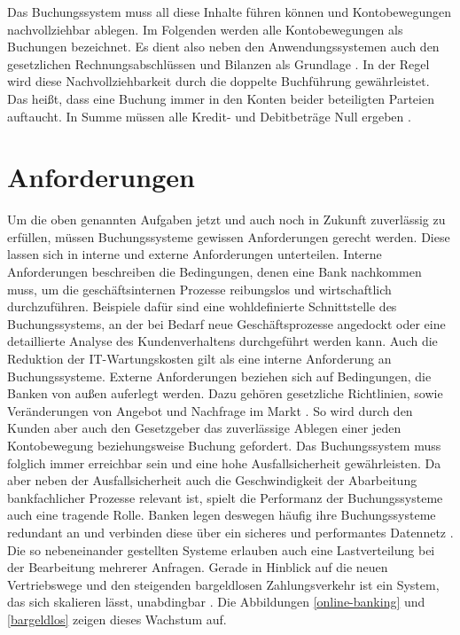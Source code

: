 \documentclass[12pt,oneside,a4paper,parskip]{scrbook}
\begin{document}
Das Buchungssystem muss all diese Inhalte führen können und Kontobewegungen nachvollziehbar ablegen. Im Folgenden werden alle Kontobewegungen als Buchungen bezeichnet. Es dient also neben den Anwendungssystemen auch den gesetzlichen Rechnungsabschlüssen und Bilanzen als Grundlage \cite{bankEnzy}\cite{MarkstudieKernbankensysteme}. In der Regel wird diese Nachvollziehbarkeit durch die doppelte Buchführung gewährleistet. Das heißt, dass eine Buchung immer in den Konten beider beteiligten Parteien auftaucht. In Summe müssen alle Kredit- und Debitbeträge Null ergeben \cite{accounting}.

\section{Anforderungen}
Um die oben genannten Aufgaben jetzt und auch noch in Zukunft zuverlässig zu erfüllen, müssen Buchungssysteme gewissen Anforderungen gerecht werden. Diese lassen sich in interne und externe Anforderungen unterteilen. Interne Anforderungen beschreiben die Bedingungen, denen eine Bank nachkommen muss, um die geschäftsinternen Prozesse reibungslos und wirtschaftlich durchzuführen. Beispiele dafür sind eine wohldefinierte Schnittstelle des Buchungssystems, an der bei Bedarf neue Geschäftsprozesse angedockt oder eine detaillierte Analyse des Kundenverhaltens durchgeführt werden kann. Auch die Reduktion der IT-Wartungskosten gilt als eine interne Anforderung an Buchungssysteme. Externe Anforderungen beziehen sich auf Bedingungen, die Banken von außen auferlegt werden. Dazu gehören gesetzliche Richtlinien, sowie Veränderungen von Angebot und Nachfrage im Markt \cite{capgemini}. So wird durch den Kunden aber auch den Gesetzgeber das zuverlässige Ablegen einer jeden Kontobewegung beziehungsweise Buchung gefordert. Das Buchungssystem muss folglich immer erreichbar sein und eine hohe Ausfallsicherheit gewährleisten. Da aber neben der Ausfallsicherheit auch die Geschwindigkeit der Abarbeitung bankfachlicher Prozesse relevant ist, spielt die Performanz der Buchungssysteme auch eine tragende Rolle. Banken legen deswegen häufig ihre Buchungssysteme redundant an und verbinden diese über ein sicheres und performantes Datennetz \cite{bankEnzy}\cite[97-99]{ITidF}. Die so nebeneinander gestellten Systeme erlauben auch eine Lastverteilung bei der Bearbeitung mehrerer Anfragen. Gerade in Hinblick auf die neuen Vertriebswege und den steigenden bargeldlosen Zahlungsverkehr ist ein System, das sich skalieren lässt, unabdingbar \cite{bankEnzy}\cite{capgemini}. Die Abbildungen \ref{online-banking} und \ref{bargeldlos} zeigen dieses Wachstum auf.
\end{document}
